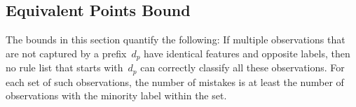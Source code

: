 \documentclass[twoside,11pt]{article}
\def\Prefix{d_p}
\def\Obj{R}
\begin{document}
\begin{arxiv}

\end{arxiv}

\subsection{Equivalent Points Bound}
\label{sec:identical}

The bounds in this section quantify the following:
%
If multiple observations that are not captured by a prefix~$\Prefix$
have identical features and opposite labels, then no rule list that
starts with~$\Prefix$ can correctly classify all these observations.
%
For each set of such observations, the number of mistakes is at least
the number of observations with the minority label within the set.
\end{document}
